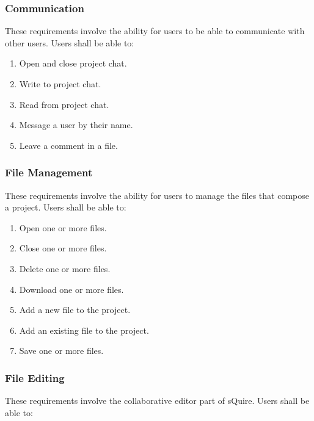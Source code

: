 \documentclass[twoside,letterpaper]{article}
\begin{document}
	\subsubsection{Communication}
	
	These requirements involve the ability for users to be able to communicate with other users. Users shall be able to:
	
	\begin{enumerate}
		\item Open and close project chat.
		\item Write to project chat.
		\item Read from project chat.
		\item Message a user by their name.
		\item Leave a comment in a file.
	\end{enumerate}
	
	\subsubsection{File Management}
	
	These requirements involve the ability for users to manage the files that compose a project. Users shall be able to:
	
	\begin{enumerate}
		\item Open one or more files.
		\item Close one or more files.
		\item Delete one or more files.
		\item Download one or more files.
		\item Add a new file to the project.
		\item Add an existing file to the project.
		\item Save one or more files.
	\end{enumerate}
	
	\subsubsection{File Editing}
	
	These requirements involve the collaborative editor part of sQuire. Users shall be able to:
	
\end{document}
